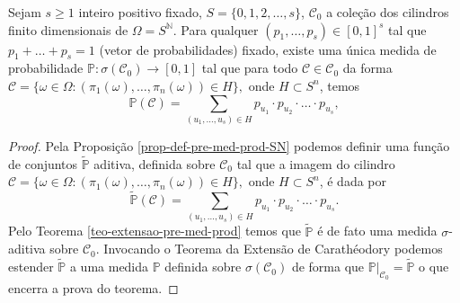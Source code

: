 \begin{teorema}
\label{teo-exist-med-prod-cartesiano-enumeravel}
Sejam $s\geq 1$ inteiro positivo fixado,
$S=\{0,1,2,\ldots,s\}$, 
$\mathscr{C}_0$ a coleção dos cilindros finito 
dimensionais de $\Omega=S^{\mathbb{N}}$.
Para qualquer $(p_1,\ldots,p_s)\in [0,1]^s$ 
tal que $p_1+\ldots +p_s=1$
(vetor de probabilidades) fixado, 
existe uma única medida de probabilidade 
$\mathbb{P}:\sigma(\mathscr{C}_0)\to [0,1]$
tal que para todo $\mathcal{C}\in\mathscr{C}_0$
da forma 
$
\mathcal{C}
=
\{
\omega\in \Omega:
(\pi_1(\omega), \ldots,\pi_n(\omega)) \in H
\},
$
onde $H\subset S^n$,  temos
\[
\mathbb{P}(\mathcal{C}) 
=
\sum_{(u_1,\ldots,u_s)\in H} 
p_{u_1}\cdot p_{u_2}\cdot\ldots\cdot p_{u_s},
\]
\end{teorema}



\begin{proof}
Pela Proposição \ref{prop-def-pre-med-prod-SN} podemos 
definir uma função de conjuntos $\widetilde{\mathbb{P}}$ 
aditiva, definida sobre $\mathscr{C}_0$ tal que a imagem do cilindro 
$
\mathcal{C}
=
\{
\omega\in \Omega:
(\pi_1(\omega), \ldots,\pi_n(\omega)) \in H
\},
$
onde $H\subset S^n$, é dada por 
\[
\widetilde{\mathbb{P}}(\mathcal{C}) 
=
\sum_{(u_1,\ldots,u_s)\in H} 
p_{u_1}\cdot p_{u_2}\cdot\ldots\cdot p_{u_s}.
\]
Pelo Teorema \ref{teo-extensao-pre-med-prod}
temos que $\widetilde{\mathbb{P}}$ é de fato 
uma medida $\sigma$-aditiva sobre $\mathscr{C}_0$.
Invocando o Teorema da Extensão de Carathéodory 
podemos estender $\widetilde{\mathbb{P}}$ a uma 
medida $\mathbb{P}$ definida sobre $\sigma(\mathscr{C}_0)$ 
de forma que 
$
\mathbb{P}\big|_{\mathscr{C}_0} = \widetilde{\mathbb{P}}
$ 
o que encerra a prova do teorema.
\end{proof}



